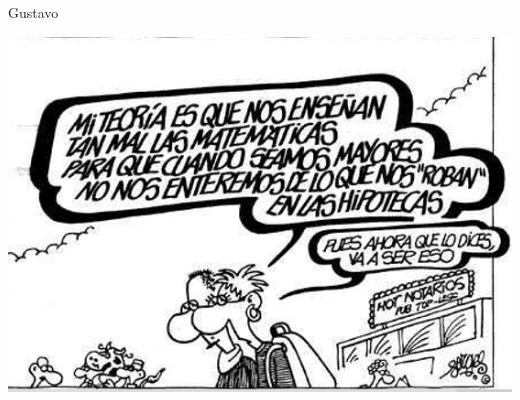 \begin{opin}{\guscolor}{Gustavo}
\begin{minipage}[hbtp]{0.5\linewidth}
	\centering
	\includegraphics[width=0.8\linewidth]{img/chistegus.png}
\end{minipage}

\end{opin}

